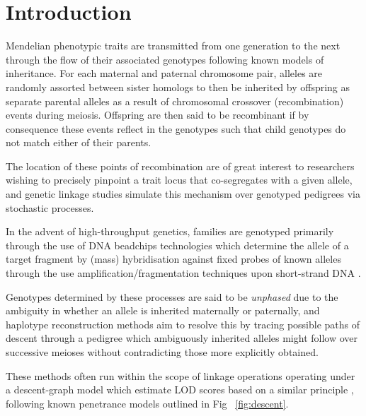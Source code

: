 
\section{Introduction}

Mendelian phenotypic traits are transmitted from one generation to the next through the flow of their associated genotypes following known models of inheritance. For each maternal and paternal chromosome pair, alleles are randomly assorted between sister homologs to then be inherited by offspring as separate parental alleles as a result of chromosomal crossover (recombination) events during meiosis. Offspring are then said to be recombinant if by consequence these events reflect in the genotypes such that child genotypes do not match either of their parents.

\vspace{-1pt}
The location of these points of recombination are of great interest to researchers wishing to precisely pinpoint a trait locus that co-segregates with a given allele, and genetic linkage studies simulate this mechanism over genotyped pedigrees via stochastic processes. 

In the advent of high-throughput genetics, families are genotyped primarily through the use of DNA beadchips technologies which determine the allele of a target fragment by (mass) hybridisation against fixed probes of known alleles through the use amplification/fragmentation techniques upon short-strand DNA \citep{oliphant2002beadarray}.

Genotypes determined by these processes are said to be \textit{unphased} due to the ambiguity in whether an allele is inherited maternally or paternally, and haplotype reconstruction methods aim to resolve this by tracing possible paths of descent through a pedigree which ambiguously inherited alleles might follow over successive meioses without contradicting those more explicitly obtained.

These methods often run within the scope of linkage operations operating under a descent-graph model which estimate LOD scores based on a similar principle \citep{sobel1996descent}, following known penetrance models outlined in Fig ~\ref{fig:descent}.

